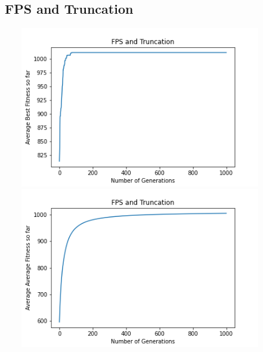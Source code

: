 \documentclass[a4paper]{article}
\begin{document}
\subsection{FPS and Truncation}
\includegraphics[width=12cm, height=7cm]{Graphs/KnapSack/fps_trunc_bsf.png} \\
\includegraphics[width=12cm, height=7cm]{Graphs/KnapSack/fps_trunc_avg.png} \\
\end{document}
